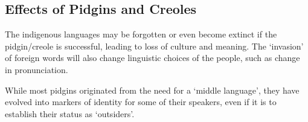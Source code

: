\documentclass[../main.tex]{subfiles}
\begin{document}
    \subsection{Effects of Pidgins and Creoles}
    The indigenous languages may be forgotten or even become extinct if the pidgin/creole is successful, leading to loss of culture and meaning. The `invasion' of foreign words will also change linguistic choices of the people, such as change in pronunciation.

    While most pidgins originated from the need for a `middle language', they have evolved into markers of identity for some of their speakers, even if it is to establish their status as `outsiders'.
\end{document}
